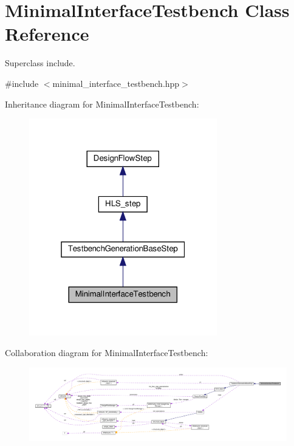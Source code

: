 \hypertarget{classMinimalInterfaceTestbench}{}\section{Minimal\+Interface\+Testbench Class Reference}
\label{classMinimalInterfaceTestbench}


Superclass include.  




{\ttfamily \#include $<$minimal\+\_\+interface\+\_\+testbench.\+hpp$>$}



Inheritance diagram for Minimal\+Interface\+Testbench\+:
\nopagebreak
\begin{figure}[H]
\begin{center}
\leavevmode
\includegraphics[width=232pt]{d8/db0/classMinimalInterfaceTestbench__inherit__graph}
\end{center}
\end{figure}


Collaboration diagram for Minimal\+Interface\+Testbench\+:
\nopagebreak
\begin{figure}[H]
\begin{center}
\leavevmode
\includegraphics[width=350pt]{d2/d6c/classMinimalInterfaceTestbench__coll__graph}
\end{center}
\end{figure}
